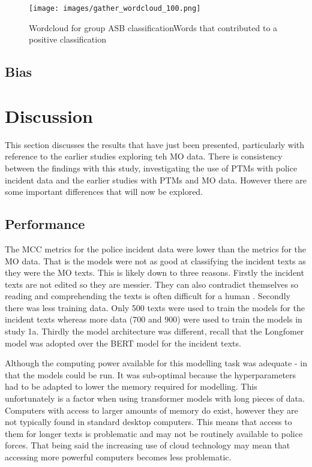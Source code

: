 \begin{figure}[h]
    \texttt{[image: images/gather\_wordcloud\_100.png]}
    \caption{{Wordcloud for group ASB classification}Words that contributed to a positive classification}
    \label{fig: wordcloud_gather}
\end{figure}
   


\subsection{Bias}




\section{Discussion} This section discusses the results that have just been presented, particularly with reference to the earlier studies exploring  teh MO data.  There is consistency between the findings with this study, investigating the use of PTMs with police incident data and the earlier studies with PTMs and MO data. However there are some important differences that will now be explored.


\subsection{Performance} The MCC metrics for the police incident data were lower than the metrics for the MO data. That is the models were not as good at classifying the incident texts as they were the MO texts. This is likely down to three reasons. Firstly the incident texts are not edited so they are messier. They can also contradict themselves so reading and comprehending the texts is often difficult for a human . Secondly there was less training data. Only 500 texts were used to train the models for the incident texts whereas more data (700 and 900) were used to train the models in study 1a. Thirdly the model architecture was different, recall that the Longfomer model was adopted over the BERT model for the incident texts. 

Although the computing power available for this modelling task was adequate - in that the models could be run. It was  sub-optimal because the hyperparameters had to be adapted to lower the memory required for modelling. This unfortunately is a factor when using transformer models with long pieces of data. Computers with access to larger amounts of memory do exist, however they are not typically found in standard desktop computers. This means that access to them for longer texts is problematic and may not be routinely available to police forces. That being said the increasing use of cloud technology may mean that accessing more powerful computers becomes less problematic.

